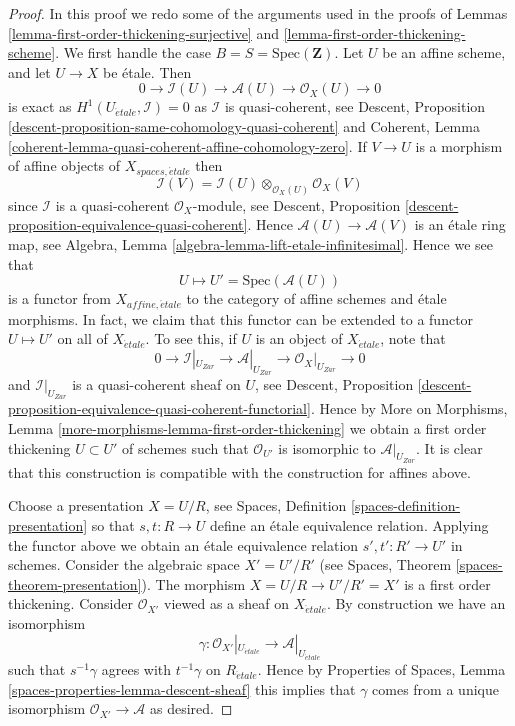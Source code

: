 \begin{proof}
In this proof we redo some of the arguments used in the
proofs of
Lemmas \ref{lemma-first-order-thickening-surjective} and
\ref{lemma-first-order-thickening-scheme}.
We first handle the case $B = S = \text{Spec}(\mathbf{Z})$.
Let $U$ be an affine scheme, and let $U \to X$ be \'etale.
Then
$$
0 \to \mathcal{I}(U) \to \mathcal{A}(U) \to \mathcal{O}_X(U) \to 0
$$
is exact as $H^1(U_{\acute{e}tale}, \mathcal{I}) = 0$ as
$\mathcal{I}$ is quasi-coherent, see
Descent, Proposition \ref{descent-proposition-same-cohomology-quasi-coherent}
and
Coherent, Lemma \ref{coherent-lemma-quasi-coherent-affine-cohomology-zero}.
If $V \to U$ is a morphism of affine objects of $X_{spaces, \acute{e}tale}$
then
$$
\mathcal{I}(V) = \mathcal{I}(U) \otimes_{\mathcal{O}_X(U)} \mathcal{O}_X(V)
$$
since $\mathcal{I}$ is a quasi-coherent $\mathcal{O}_X$-module, see
Descent, Proposition \ref{descent-proposition-equivalence-quasi-coherent}.
Hence $\mathcal{A}(U) \to \mathcal{A}(V)$ is an
\'etale ring map, see
Algebra, Lemma \ref{algebra-lemma-lift-etale-infinitesimal}.
Hence we see that
$$
U \longmapsto U' = \text{Spec}(\mathcal{A}(U))
$$
is a functor from $X_{affine, \acute{e}tale}$ to the category of affine
schemes and \'etale morphisms. In fact, we claim that this functor can
be extended to a functor $U \mapsto U'$ on all of $X_{\acute{e}tale}$.
To see this, if $U$ is an object of $X_{\acute{e}tale}$, note that
$$
0 \to \mathcal{I}|_{U_{Zar}} \to \mathcal{A}|_{U_{Zar}} \to
\mathcal{O}_X|_{U_{Zar}} \to 0
$$
and $\mathcal{I}|_{U_{Zar}}$ is a quasi-coherent sheaf on $U$, see
Descent,
Proposition \ref{descent-proposition-equivalence-quasi-coherent-functorial}.
Hence by
More on Morphisms, Lemma \ref{more-morphisms-lemma-first-order-thickening}
we obtain a first order thickening $U \subset U'$ of schemes such that
$\mathcal{O}_{U'}$ is isomorphic to $\mathcal{A}|_{U_{Zar}}$. It is clear that
this construction is compatible with the construction for affines above.

\medskip\noindent
Choose a presentation $X = U/R$, see
Spaces, Definition \ref{spaces-definition-presentation}
so that $s, t : R \to U$ define an \'etale equivalence relation.
Applying the functor above we obtain an \'etale equivalence
relation $s', t' : R' \to U'$ in schemes. Consider the algebraic space
$X' = U'/R'$ (see
Spaces, Theorem \ref{spaces-theorem-presentation}).
The morphism $X = U/R \to U'/R' = X'$ is a first order thickening.
Consider $\mathcal{O}_{X'}$ viewed as a sheaf on $X_{\acute{e}tale}$.
By construction we have an isomorphism
$$
\gamma :
\mathcal{O}_{X'}|_{U_{\acute{e}tale}}
\longrightarrow
\mathcal{A}|_{U_{\acute{e}tale}}
$$
such that $s^{-1}\gamma$ agrees with $t^{-1}\gamma$ on $R_{\acute{e}tale}$.
Hence by
Properties of Spaces, Lemma \ref{spaces-properties-lemma-descent-sheaf}
this implies that $\gamma$ comes from a unique isomorphism
$\mathcal{O}_{X'} \to \mathcal{A}$ as desired.


\end{proof}

